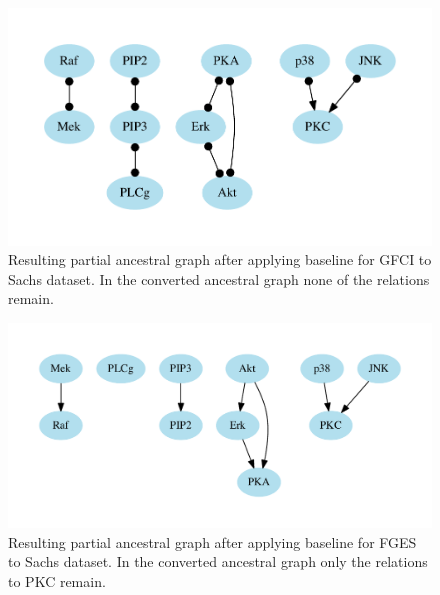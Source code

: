 \documentclass[a4paper,pdf]{article}
\begin{document}
\begin{figure}[!ht]
    \centering
    \includegraphics[width=\textwidth]{additional/obsSachsGraph_bootstrap0_priorFALSEgfci}
    \caption{Resulting partial ancestral graph after applying baseline for GFCI to Sachs dataset. In the converted ancestral graph none of the relations remain.\label{fig:obsSachsPagsgfci}}
\end{figure}
\begin{figure}[!ht]
    \centering
    \includegraphics[width=\textwidth]{additional/obsSachsGraph_bootstrap0_priorFALSEfges}
    \caption{Resulting partial ancestral graph after applying baseline for FGES to Sachs dataset. In the converted ancestral graph only the relations to PKC remain. \label{fig:obsSachsPagsfges}}
\end{figure}
\newpage
\end{document}
